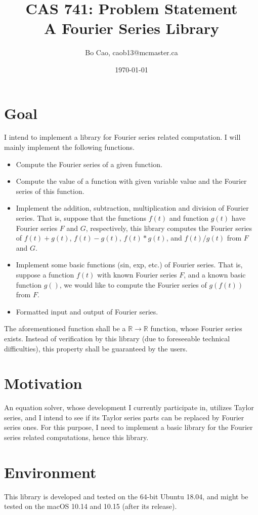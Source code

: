 \documentclass{article}
\title{CAS 741: Problem Statement\\A Fourier Series Library}
\author{Bo Cao, caob13@mcmaster.ca}
\date{\today}
\begin{document}
\maketitle

\section{Goal}
I intend to implement a library for Fourier series related computation. I will mainly implement the following functions.
\begin{itemize}
	\item Compute the Fourier series of a given function.
	\item Compute the value of a function with given variable value and the Fourier series of this function.
	\item Implement the addition, subtraction, multiplication and division of Fourier series. That is, suppose that the functions $f(t)$ and function $g(t)$ have Fourier series $F$ and $G$, respectively, this library computes the Fourier series of $f(t)+g(t)$, $f(t)-g(t)$, $f(t)*g(t)$, and $f(t)/g(t)$ from $F$ and $G$. 
	\item Implement some basic functions (sin, exp, etc.) of Fourier series. That is, suppose a function $f(t)$ with known Fourier series $F$, and a known basic function $g()$, we would like to compute the Fourier series of $g(f(t))$ from $F$. 
	\item Formatted input and output of Fourier series. 
\end{itemize}

The aforementioned function shall be a $\mathbb{R}\rightarrow\mathbb{R}$ function, whose Fourier series exists. Instead of verification by this library (due to foreseeable technical difficulties), this property shall be guaranteed by the users. 

\section{Motivation}
An equation solver, whose development I currently participate in, utilizes Taylor series, and I intend to see if its Taylor series parts can be replaced by Fourier series ones. For this purpose, I need to implement a basic library for the Fourier series related computations, hence this library.

\section{Environment}
This library is developed and tested on the 64-bit Ubuntu 18.04, and might be tested on the macOS 10.14 and 10.15 (after its release). 
\end{document}
